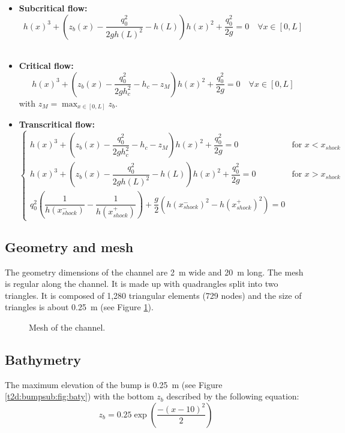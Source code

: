 \begin{itemize}
\item {\bf Subcritical flow:}
\begin{equation}
 h(x)^3 + \left( z_b(x) - \dfrac{q_0^2}{2g h(L)^2} - h(L) \right) h(x)^2 + \dfrac{q_0^2}{2g} = 0 \quad \forall x \in [0,L]
\end{equation}
\

\item {\bf Critical flow:}
\begin{equation}
h(x)^3 + \left( z_b(x) - \dfrac{q_0^2}{2g h_c^2} - h_c - z_M \right) h(x)^2 + \dfrac{q_0^2}{2g} = 0 \quad \forall x \in [0,L]
\end{equation}
with $ z_M = \max_{x \in [0,L]}z_b$.
\

\item {\bf Transcritical flow:}
\begin{equation}
\begin{cases}
h(x)^3 + \left( z_b(x) - \dfrac{q_0^2}{2g h_c^2} - h_c - z_M \right) h(x)^2 + \dfrac{q_0^2}{2g} = 0 \quad & \text{for  } x < x_{shock}  \\
h(x)^3 + \left( z_b(x) - \dfrac{q_0^2}{2g h(L)^2} - h(L) \right) h(x)^2 + \dfrac{q_0^2}{2g} = 0 \quad &\text{for  } x > x_{shock} \\
q_0^2 \left( \dfrac{1}{h(x_{shock}^-)} - \dfrac{1}{h(x_{shock}^+)} \right) + \dfrac{g}{2} \left( h(x_{shock}^-)^2 -h(x_{shock}^+)^2 \right) = 0
\end{cases}
\end{equation}
\end{itemize}

\subsection{Geometry and mesh}

The geometry dimensions of the channel are 2~m wide and 20~m long.
The mesh is regular along the channel. It is made up with
quadrangles split into two triangles.
It is composed of 1,280 triangular elements (729 nodes)
and the size of triangles is about 0.25~m
(see Figure \ref{t2d:bumpsub:fig:mesh}).

\begin{figure}[!htbp]
 \centering
 \caption{Mesh of the channel.}
 \label{t2d:bumpsub:fig:mesh}
\end{figure}

\subsection{Bathymetry}
The maximum elevation of
the bump is 0.25~m (see Figure \ref{t2d:bumpsub:fig:baty}) with
the bottom $z_b$ described by the following equation:
\begin{equation*}
z_b = 0.25 \exp \left(\dfrac{-(x-10)^2}{2} \right)
\end{equation*}

